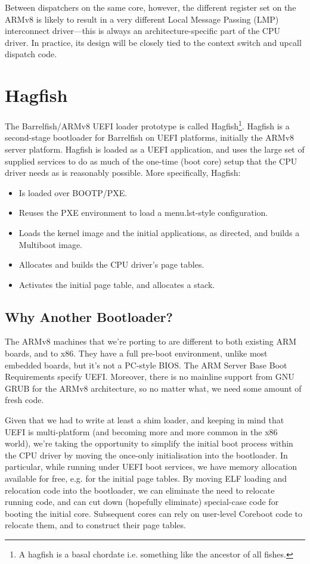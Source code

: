 \documentclass[a4paper,twoside]{report}
\begin{document}
Between dispatchers on the same core, however, the different register set on
the ARMv8 is likely to result in a very different Local Message Passing (LMP)
interconnect driver---this is always an architecture-specific part of the CPU
driver. In practice, its design will be closely tied to the context switch and
upcall dispatch code.

\section{Hagfish}\label{s:hagfish}

The Barrelfish/ARMv8 UEFI loader prototype is called Hagfish\footnote{A
hagfish is a basal chordate i.e. something like the ancestor of all fishes.}.
Hagfish is a second-stage bootloader for Barrelfish on UEFI platforms,
initially the ARMv8 server platform.  Hagfish is loaded as a UEFI application,
and uses the large set of supplied services to do as much of the one-time
(boot core) setup that the CPU driver needs as is reasonably possible. More
specifically, Hagfish:

\begin{itemize}
\item Is loaded over BOOTP/PXE.
\item Reuses the PXE environment to load a menu.lst-style configuration.
\item Loads the kernel image and the initial applications, as directed, and
builds a Multiboot image.
\item Allocates and builds the CPU driver's page tables.
\item Activates the initial page table, and allocates a stack.
\end{itemize}

\subsection{Why Another Bootloader?}

The ARMv8 machines that we're porting to are different to both existing ARM
boards, and to x86. They have a full pre-boot environment, unlike most
embedded boards, but it's not a PC-style BIOS. The ARM Server Base Boot
Requirements specify UEFI. Moreover, there is no mainline support from GNU
GRUB for the ARMv8 architecture, so no matter what, we need some amount of
fresh code.

Given that we had to write at least a shim loader, and keeping in mind that
UEFI is multi-platform (and becoming more and more common in the x86 world),
we're taking the opportunity to simplify the initial boot process within the
CPU driver by moving the once-only initialisation into the bootloader. In
particular, while running under UEFI boot services, we have memory allocation
available for free, e.g. for the initial page tables. By moving ELF loading
and relocation code into the bootloader, we can eliminate the need to relocate
running code, and can cut down (hopefully eliminate) special-case code for
booting the initial core. Subsequent cores can rely on user-level Coreboot
code to relocate them, and to construct their page tables.
\end{document}

